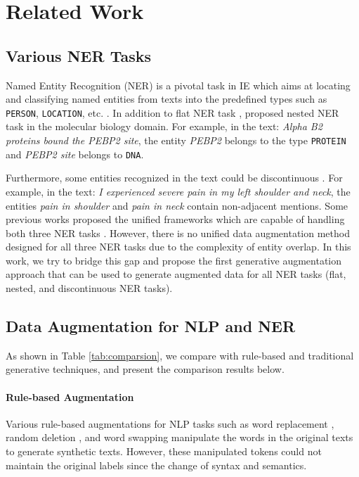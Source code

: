 \section{Related Work}
\label{sec:related}

\subsection{Various NER Tasks}
Named Entity Recognition (NER) is a pivotal task in IE which aims at locating and classifying named entities from texts into the predefined types such as \texttt{PERSON}, \texttt{LOCATION}, etc. \cite{chiu2016named,xu2017local,yu2020named}. In addition to flat NER task \cite{sang2003introduction}, \citet{kim2003genia} proposed nested NER task in the molecular biology domain. For example, in the text: \textit{Alpha B2 proteins bound the PEBP2 site}, the entity \textit{PEBP2} belongs to the type \texttt{PROTEIN} and \textit{PEBP2 site} belongs to \texttt{DNA}. 

Furthermore, some entities recognized in the text could be discontinuous \cite{Mowery2013Task1S, Mowery2014Task2S, karimi2015cadec}. For example, in the text: \textit{I experienced severe pain in my left shoulder and neck}, the entities \textit{pain in shoulder} and \textit{pain in neck} contain non-adjacent mentions. Some previous works proposed the unified frameworks which are capable of handling both three NER tasks \cite{li-etal-2020-unified,yan-etal-2021-unified-generative,li-etal-2021-span}. However, there is no unified data augmentation method designed for all three NER tasks due to the complexity of entity overlap. In this work, we try to bridge this gap and propose the first generative augmentation approach {\modelname} that can be used to generate augmented data for all NER tasks (flat, nested, and discontinuous NER tasks). 

\subsection{Data Augmentation for NLP and NER}
As shown in Table \ref{tab:comparsion}, we compare {\modelname} with rule-based and traditional generative techniques, and present the comparison results below.
\paragraph{Rule-based Augmentation}
Various rule-based augmentations for NLP tasks such as word replacement \cite{zhang2015character,cai2020data}, random deletion \cite{kobayashi2018contextual,wei2019eda}, and word swapping \cite{csahin2018data,min2020syntactic} manipulate the words in the original texts to generate synthetic texts.
However, these manipulated tokens could not maintain the original labels since the change of syntax and semantics.

